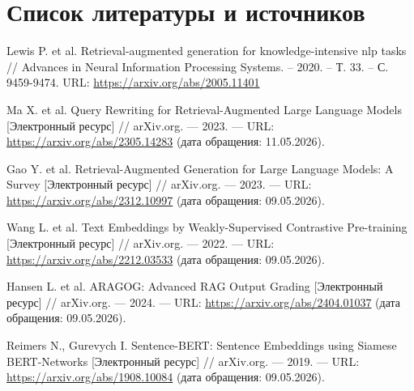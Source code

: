 \documentclass{article}
\begin{document}
 








\newpage
\section*{Список литературы и источников}

\begin{enumerate}[label={[\arabic*]}]
    
    Lewis P. et al. Retrieval-augmented generation for knowledge-intensive nlp tasks // Advances in Neural Information Processing Systems. – 2020. – Т. 33. – С. 9459-9474. URL: \url{https://arxiv.org/abs/2005.11401} 

    Ma X. et al. Query Rewriting for Retrieval-Augmented Large Language Models [Электронный ресурс] // arXiv.org. — 2023. — URL: \url{https://arxiv.org/abs/2305.14283} (дата обращения: 11.05.2026).


    Gao Y. et al. Retrieval-Augmented Generation for Large Language Models: A Survey [Электронный ресурс] // arXiv.org. — 2023. — URL: \url{https://arxiv.org/abs/2312.10997} (дата обращения: 09.05.2026).


    Wang L. et al. Text Embeddings by Weakly-Supervised Contrastive Pre-training [Электронный ресурс] // arXiv.org. — 2022. — URL: \url{https://arxiv.org/abs/2212.03533} (дата обращения: 09.05.2026).

    Hansen L. et al. ARAGOG: Advanced RAG Output Grading [Электронный ресурс] // arXiv.org. — 2024. — URL: \url{https://arxiv.org/abs/2404.01037} (дата обращения: 09.05.2026).

    Reimers N., Gurevych I. Sentence-BERT: Sentence Embeddings using Siamese BERT-Networks [Электронный ресурс] // arXiv.org. — 2019. — URL: \url{https://arxiv.org/abs/1908.10084} (дата обращения: 09.05.2026).

   

\end{enumerate}








\end{document}
